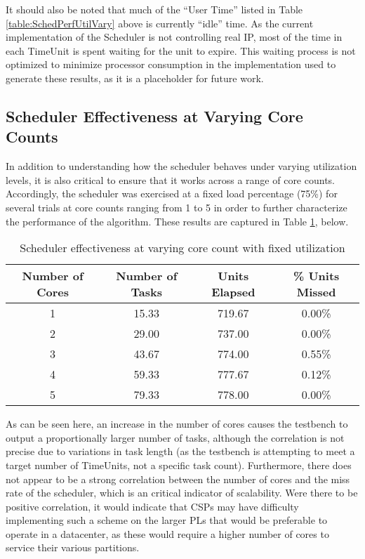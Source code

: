 It should also be noted that much of the ``User Time'' listed in Table \ref{table:SchedPerfUtilVary} above is currently ``idle'' time. As the current implementation of the Scheduler is not controlling real IP, most of the time in each TimeUnit is spent waiting for the unit to expire. This waiting process is not optimized to minimize processor consumption in the implementation used to generate these results, as it is a placeholder for future work.

\subsection{Scheduler Effectiveness at Varying Core Counts}\label{subsec:SchedulerDataCoresVary}
In addition to understanding how the scheduler behaves under varying utilization levels, it is also critical to ensure that it works across a range of core counts. Accordingly, the scheduler was exercised at a fixed load percentage (75\%) for several trials at core counts ranging from 1 to 5 in order to further characterize the performance of the algorithm. These results are captured in Table \ref{table:SchedEffectivenessCoresVary}, below.

\begin{table}[ht!]
    \centering\begin{tabular}{| c | c | c | c |}
        \hline
        Number of Cores & Number of Tasks & Units Elapsed & \% Units Missed \\
        \hline
        1 & 15.33 & 719.67 & 0.00\% \\
        2 & 29.00 & 737.00 & 0.00\% \\
        3 & 43.67 & 774.00 & 0.55\% \\
        4 & 59.33 & 777.67 & 0.12\% \\
        5 & 79.33 & 778.00 & 0.00\% \\
        \hline
    \end{tabular}
    \caption{Scheduler effectiveness at varying core count with fixed utilization}
    \label{table:SchedEffectivenessCoresVary}
\end{table}

As can be seen here, an increase in the number of cores causes the testbench to output a proportionally larger number of tasks, although the correlation is not precise due to variations in task length (as the testbench is attempting to meet a target number of TimeUnits, not a specific task count). Furthermore, there does not appear to be a strong correlation between the number of cores and the miss rate of the scheduler, which is an critical indicator of scalability. Were there to be positive correlation, it would indicate that CSPs may have difficulty implementing such a scheme on the larger PLs that would be preferable to operate in a datacenter, as these would require a higher number of cores to service their various partitions.

